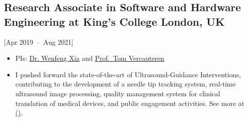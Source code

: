 \documentclass{mycv}
\begin{document}
\subsection{Research Associate in Software and Hardware Engineering at King's College London, UK}[Apr 2019~--~Aug 2021]
\begin{itemize}
  \item PIs: \href{https://www.purlkcl.org/}{Dr. Wenfeng Xia} and \href{https://cai4cai.ml}{Prof.~Tom Vercauteren}
  \item 
I pushed forward the state-of-the-art of Ultrasound-Guidance Interventions, 
	contributing to the development of a needle tip tracking system, real-time ultrasound image processing, 
	quality management system for clinical translation of medical devices, and public engagement activities.
	See more at \href{https://cai4cai.ml/author/miguel-xochicale/}{(\faExternalLink*)}.
\end{itemize}


\end{document}
